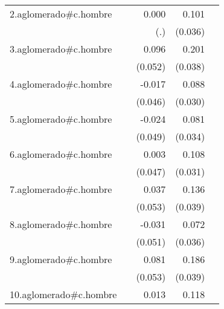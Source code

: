 {\begin{longtable}{l*{4}{D{.}{.}{-1}}}
\addlinespace
2.aglomerado#c.hombre&                     &       0.000         &       0.101\sym{**} &                     \\
            &                     &         (.)         &     (0.036)         &                     \\
\addlinespace
3.aglomerado#c.hombre&                     &       0.096         &       0.201\sym{***}&                     \\
            &                     &     (0.052)         &     (0.038)         &                     \\
\addlinespace
4.aglomerado#c.hombre&                     &      -0.017         &       0.088\sym{**} &                     \\
            &                     &     (0.046)         &     (0.030)         &                     \\
\addlinespace
5.aglomerado#c.hombre&                     &      -0.024         &       0.081\sym{*}  &                     \\
            &                     &     (0.049)         &     (0.034)         &                     \\
\addlinespace
6.aglomerado#c.hombre&                     &       0.003         &       0.108\sym{***}&                     \\
            &                     &     (0.047)         &     (0.031)         &                     \\
\addlinespace
7.aglomerado#c.hombre&                     &       0.037         &       0.136\sym{***}&                     \\
            &                     &     (0.053)         &     (0.039)         &                     \\
\addlinespace
8.aglomerado#c.hombre&                     &      -0.031         &       0.072\sym{*}  &                     \\
            &                     &     (0.051)         &     (0.036)         &                     \\
\addlinespace
9.aglomerado#c.hombre&                     &       0.081         &       0.186\sym{***}&                     \\
            &                     &     (0.053)         &     (0.039)         &                     \\
\addlinespace
10.aglomerado#c.hombre&                     &       0.013         &       0.118\sym{***}&                     \\

\end{longtable}}
